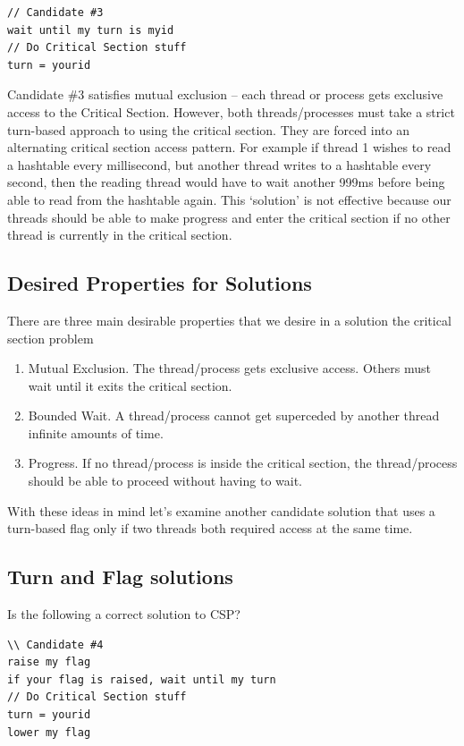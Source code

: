 \begin{lstlisting}
// Candidate #3
wait until my turn is myid
// Do Critical Section stuff
turn = yourid
\end{lstlisting}

Candidate \#3 satisfies mutual exclusion -- each thread or process gets exclusive access to the Critical Section.
However, both threads/processes must take a strict turn-based approach to using the critical section.
They are forced into an alternating critical section access pattern.
For example if thread 1 wishes to read a hashtable every millisecond, but another thread writes to a hashtable every second, then the reading thread would have to wait another 999ms before being able to read from the hashtable again.
This `solution' is not effective because our threads should be able to make progress and enter the critical section if no other thread is currently in the critical section.

\subsection{Desired Properties for Solutions}

There are three main desirable properties that we desire in a solution the critical section problem

\begin{enumerate}
\item Mutual Exclusion. The thread/process gets exclusive access.
  Others must wait until it exits the critical section.
\item Bounded Wait. A thread/process cannot get superceded by another thread infinite amounts of time.
\item Progress. If no thread/process is inside the critical section, the thread/process should be able to proceed without having to wait.
\end{enumerate}

With these ideas in mind let's examine another candidate solution that uses a turn-based flag only if two threads both required access at the same time.

\subsection{Turn and Flag solutions}

Is the following a correct solution to CSP?

\begin{lstlisting}
\\ Candidate #4
raise my flag
if your flag is raised, wait until my turn
// Do Critical Section stuff
turn = yourid
lower my flag
\end{lstlisting}

